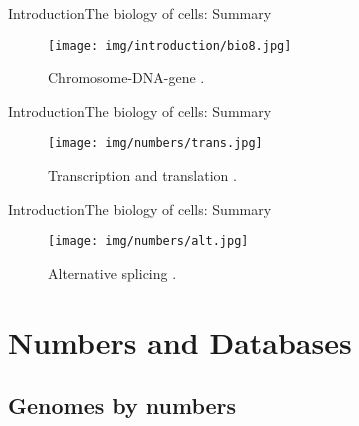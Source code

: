 \documentclass[10pt]{beamer}
\newcommand{\1}{
	\setbeamertemplate{background}{
		\texttt{[image: img/1]}
		\tikz[overlay] \fill[fill opacity=0.75,fill=white] (0,0) rectangle (-\paperwidth,\paperheight);
	}
}
\begin{document}
\begin{frame}{Introduction}{The biology of cells: Summary}
\begin{figure}[]
 \centering
    \texttt{[image: img/introduction/bio8.jpg]}
    \label{img:mot2}
    \caption{Chromosome-DNA-gene \cite{dnacromosome2020}.}
\end{figure}
\end{frame}

\begin{frame}{Introduction}{The biology of cells: Summary}
\begin{figure}[]
 \centering
    \texttt{[image: img/numbers/trans.jpg]}
    \label{img:mot2}
    \caption{Transcription and translation \cite{nci2020}.}
\end{figure}
\end{frame}

\begin{frame}{Introduction}{The biology of cells: Summary}
\begin{figure}[]
 \centering
    \texttt{[image: img/numbers/alt.jpg]}
    \label{img:mot2}
    \caption{Alternative splicing \cite{genbio2020}.}
\end{figure}
\end{frame}


\section{Numbers and Databases}

\subsection{Genomes by numbers}
\end{document}
